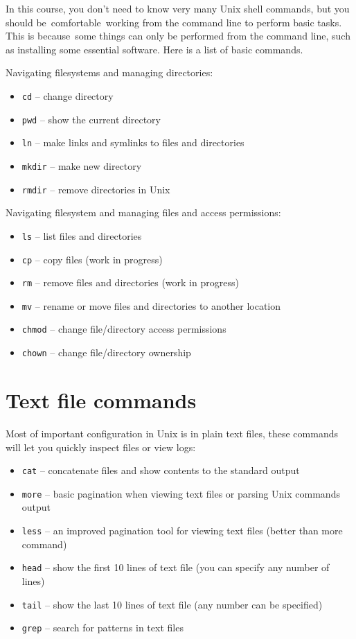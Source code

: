 \documentclass[
  letterpaper,
  DIV=11,
  numbers=noendperiod]{scrreport}
\providecommand{\tightlist}{%
  \setlength{\itemsep}{0pt}\setlength{\parskip}{0pt}}\usepackage{longtable,booktabs,array}
\begin{document}
In this course, you don't need to know very many Unix shell commands,
but you should be~comfortable~working from the command line to perform
basic tasks. This is because~some things can only be performed from the
command line, such as installing some essential software. Here is a list
of basic commands.

Navigating filesystems and managing directories:

\begin{itemize}
\tightlist
\item
  \texttt{cd} -- change directory
\item
  \texttt{pwd} -- show the current directory
\item
  \texttt{ln} -- make links and symlinks to files and directories
\item
  \texttt{mkdir} -- make new directory
\item
  \texttt{rmdir} -- remove directories in Unix
\end{itemize}

Navigating filesystem and managing files and access permissions:

\begin{itemize}
\tightlist
\item
  \texttt{ls} -- list files and directories
\item
  \texttt{cp} -- copy files (work in progress)
\item
  \texttt{rm} -- remove files and directories (work in progress)
\item
  \texttt{mv} -- rename or move files and directories to another
  location
\item
  \texttt{chmod} -- change file/directory access permissions
\item
  \texttt{chown} -- change file/directory ownership
\end{itemize}

\hypertarget{text-file-commands}{%
\section{Text file commands}\label{text-file-commands}}

Most of important configuration in Unix is in plain text files, these
commands will let you quickly inspect files or view logs:

\begin{itemize}
\tightlist
\item
  \texttt{cat} -- concatenate files and show contents to the standard
  output
\item
  \texttt{more} -- basic pagination when viewing text files or parsing
  Unix commands output
\item
  \texttt{less} -- an improved pagination tool for viewing text files
  (better than more command)
\item
  \texttt{head} -- show the first 10 lines of text file (you can specify
  any number of lines)
\item
  \texttt{tail} -- show the last 10 lines of text file (any number can
  be specified)
\item
  \texttt{grep} -- search for patterns in text files
\end{itemize}
\end{document}
